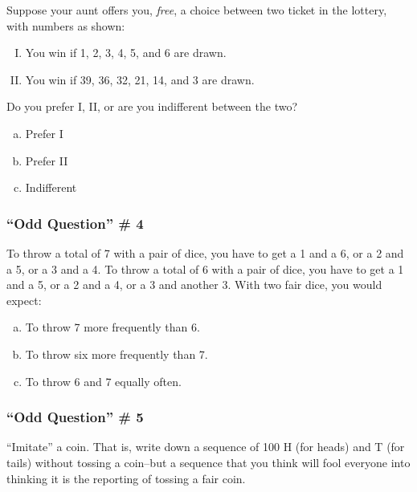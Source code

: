 \documentclass{beamer}
\begin{document}
\begin{singlespace}
\begin{frame}
	Suppose your aunt offers you, \emph{free}, a choice between two ticket in the lottery, with 
	numbers as shown:
	\begin{enumerate}[I.]
		\item You win if 1, 2, 3, 4, 5, and 6 are drawn.
		\item You win if 39, 36, 32, 21, 14, and 3 are drawn.
	\end{enumerate}
	\vspace{1em}
	Do you prefer I, II, or are you indifferent between the two?
	\begin{enumerate}[(a)]
		\item Prefer I
		\item Prefer II
		\item Indifferent
	\end{enumerate}
\end{frame}

\begin{frame}
\frametitle{``Odd Question'' \# 4}
    To throw a total of 7 with a pair of dice, you have to get a 1 and a 6, or a 2 and a 5, or a 3 and a 4.
    To throw a total of 6 with a pair of dice, you have to get a 1 and a 5, or a 2 and a 4, or a 3 and 
    another 3.
	\vspace{1em}
	With two fair dice, you would expect:
	\begin{enumerate}[(a)]
		\item To throw 7 more frequently than 6.
		\item To throw six more frequently than 7.
		\item To throw 6 and 7 equally often.
	\end{enumerate}
\end{frame}

\end{singlespace}

\begin{frame}
\frametitle{``Odd Question'' \# 5}
	``Imitate'' a coin. That is, write down a sequence of 100 H (for heads) and T (for tails) without                                                                                                                     
	tossing a coin--but a sequence that you think will fool everyone into thinking it is the reporting of 
	tossing a fair coin.		
\end{frame}
\end{document}
